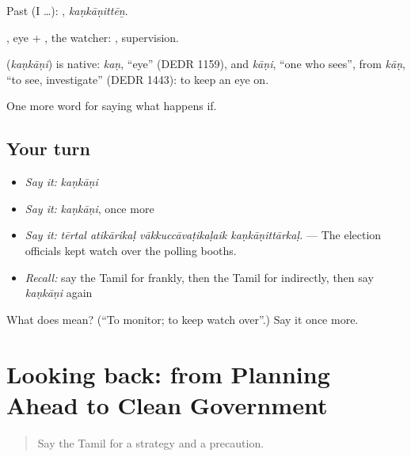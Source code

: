 Past (I …): , \emph{kaṇkāṇittēṉ}.

, eye + , the watcher: , supervision.

\begin{cousinweb}
\textbf{} (\emph{kaṇkāṇi}) is native: \emph{kaṇ}, \textquotedblleft{}eye\textquotedblright{} (DEDR 1159), and \emph{kāṇi}, \textquotedblleft{}one who sees\textquotedblright{}, from \emph{kāṇ}, \textquotedblleft{}to see, investigate\textquotedblright{} (DEDR 1443): to keep an eye on.
\end{cousinweb}

\begin{grammarlens}[title={What you've built}]
One more word for saying what happens if.
\end{grammarlens}

\subsection*{Your turn}
\begin{itemize}
\raggedright
  \item \emph{Say it:} \emph{kaṇkāṇi}
  \item \emph{Say it:} \emph{kaṇkāṇi}, once more
  \item \emph{Say it:} \emph{tērtal atikārikaḷ vākkuccāvaṭikaḷaik kaṇkāṇittārkaḷ.} — The election officials kept watch over the polling booths.
  \item \emph{Recall:} say the Tamil for frankly, then the Tamil for indirectly, then say \emph{kaṇkāṇi} again
\end{itemize}

\begin{tcolorbox}[breakable,colback=teal!4,colframe=teal!35!black,title={Before you move on}]
What does  mean? (\textquotedblleft{}To monitor; to keep watch over\textquotedblright{}.) Say it once more.
\end{tcolorbox}
\section[(dialogue)]{Looking back: from Planning Ahead to Clean Government}

\label{lesson:TA-R392-review-386-392}



\begin{quote}
Say the Tamil for a strategy and a precaution.
\end{quote}

